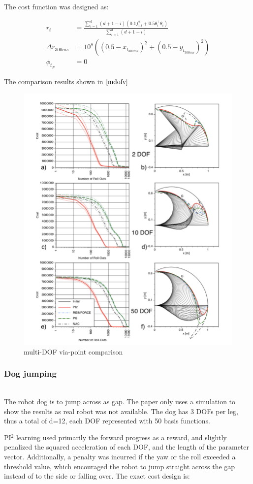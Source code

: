 \documentclass[journal]{IEEEtran}
\begin{document}
The cost function was designed as:


\begin{equation} 
  \begin{aligned}
    r_t &= \frac{\sum_{i=1}^{d}(d+1-i)(0.1f_{i,t}^2+ 0.5\theta_i^{\top}\theta_i)}{\sum_{i=1}^{d}(d+1-i)} \\
    \Delta r_{300ms} &= 10^8((0.5 - x_{t_{300ms}})^2+(0.5 - y_{t_{300ms}})^{2})  \nonumber \\ 
    \phi_{t_N} &= 0 
  \end{aligned}
\end{equation}

The comparison results shown in $\ref{mdofv}$

\begin{figure}[htbp]
  \includegraphics[width = .5\textwidth]{mdofv}
  \caption{multi-DOF via-point comparison}
  \label{mdofv}
\end{figure}

\subsubsection{Dog jumping}
\ \\
The robot dog is to jump across as gap. The paper only uses a simulation to show the results as real robot was not available. 
The dog has 3 DOFs per leg, thus a total of d=12, each DOF represented with 50 basis functions. 

PI$^2$ learning used primarily the forward progress as a reward, and slightly penalized the squared acceleration of each DOF, 
and the length of the parameter vector. Additionally, a penalty was incurred if the yaw or the roll exceeded a threshold value, which encouraged the
robot to jump straight across the gap instead of to the side or falling over. The exact cost design is:
\end{document}
